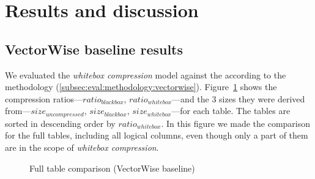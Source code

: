 \section{Results and discussion}
\label{sec:eval:resultsdiscussion}


\graphicspath{{6_evaluation/images/}}

% 


\subsection{VectorWise baseline results}
\label{subsec:eval:results:vectorwise}

We evaluated the \textit{whitebox compression} model against the  according to the methodology (\ref{subsec:eval:methodology:vectorwise}). Figure~\ref{fig:eval:results:vectorwise:total} shows the compression ratios---\(ratio_{blackbox}\), \(ratio_{whitebox}\)---and the 3 sizes they were derived from---\(size_{uncompressed}\), \(size_{blackbox}\), \(size_{whitebox}\)---for each table. The tables are sorted in descending order by \(ratio_{whitebox}\). In this figure we made the comparison for the full tables, including all logical columns, even though only a part of them are in the scope of \textit{whitebox compression}.

\begin{figure}[h]
  \centering
  \caption{Full table comparison (VectorWise baseline)}
  \label{fig:eval:results:vectorwise:total}
\end{figure}

